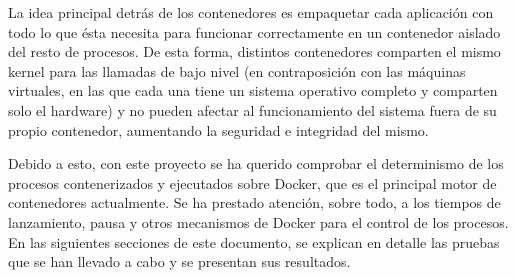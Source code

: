La idea principal detrás de los contenedores es empaquetar cada aplicación con
todo lo que ésta necesita para funcionar correctamente en un contenedor aislado
del resto de procesos. De esta forma, distintos contenedores comparten el mismo
kernel para las llamadas de bajo nivel (en contraposición con las máquinas
virtuales, en las que cada una tiene un sistema operativo completo y comparten
solo el hardware) y no pueden afectar al funcionamiento del sistema fuera de su
propio contenedor, aumentando la seguridad e integridad del mismo.

Debido a esto, con este proyecto se ha querido comprobar el determinismo de los
procesos contenerizados y ejecutados sobre Docker, que es el principal motor de
contenedores actualmente. Se ha prestado atención, sobre todo, a los tiempos de
lanzamiento, pausa y otros mecanismos de Docker para el control de los procesos.
En las siguientes secciones de este documento, se explican en detalle las
pruebas que se han llevado a cabo y se presentan sus resultados.
